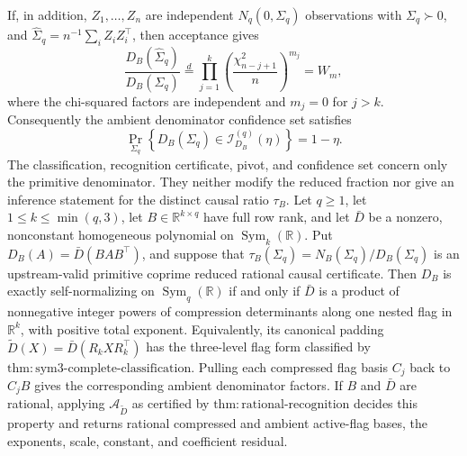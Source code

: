 If, in addition, \(Z_1,\ldots,Z_n\) are independent
\(N_q(0,\Sigma_q)\) observations with \(\Sigma_q\succ0\), and
\(\widehat\Sigma_q=n^{-1}\sum_iZ_iZ_i^{\top}\), then acceptance gives
\[
 \frac{D_B(\widehat\Sigma_q)}{D_B(\Sigma_q)}
 \stackrel{d}{=}
 \prod_{j=1}^{k}
 \left(\frac{\chi^2_{n-j+1}}{n}\right)^{m_j}
 =W_m,
\]
where the chi-squared factors are independent and \(m_j=0\) for
\(j>k\).  Consequently the ambient denominator confidence set satisfies
\[
 \Pr_{\Sigma_q}\!\left\{D_B(\Sigma_q)
 \in\mathcal I_{D_B}^{(q)}(\eta)\right\}=1-\eta.
\]
The classification, recognition certificate, pivot, and confidence set
concern only the primitive denominator.  They neither modify the reduced
fraction nor give an inference statement for the distinct causal ratio
\(\tau_B\).
Let \(q\geq1\), let \(1\leq k\leq\min(q,3)\), let
\(B\in\mathbb R^{k\times q}\) have full row rank, and let \(\bar D\)
be a nonzero, nonconstant homogeneous polynomial on
\(\operatorname{Sym}_k(\mathbb R)\).  Put
\(D_B(A)=\bar D(BAB^{\top})\), and suppose that
\(\tau_B(\Sigma_q)=N_B(\Sigma_q)/D_B(\Sigma_q)\) is an upstream-valid
primitive coprime reduced rational causal certificate.  Then \(D_B\) is
exactly self-normalizing on \(\operatorname{Sym}_q(\mathbb R)\) if and
only if \(\bar D\) is a product of nonnegative integer powers of
compression determinants along one nested flag in \(\mathbb R^k\),
with positive total exponent.  Equivalently, its canonical padding
\(\widetilde D(X)=\bar D(R_kXR_k^{\top})\) has the three-level flag form
classified by \(\mathrm{thm{:}sym3\text{-}complete\text{-}classification}\).
Pulling each compressed flag basis \(C_j\) back to \(C_jB\) gives the
corresponding ambient denominator factors.  If \(B\) and \(\bar D\)
are rational, applying \(\mathcal A_{\widetilde D}\) as certified by
\(\mathrm{thm{:}rational\text{-}recognition}\) decides this property and
returns rational compressed and ambient active-flag bases, the
exponents, scale, constant, and coefficient residual.


